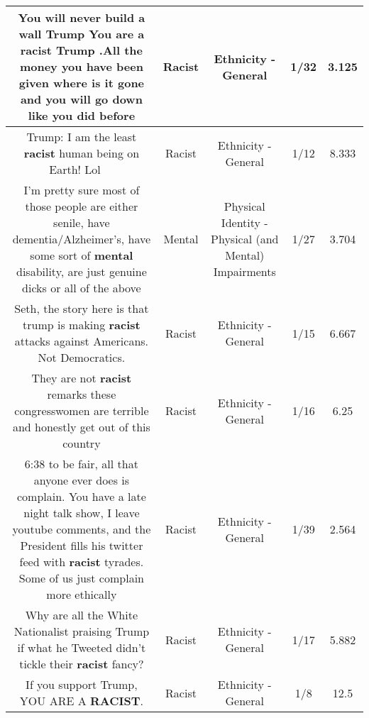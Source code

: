 \documentclass[11pt]{article}
\newlength\mylength
\begin{document}
\begin{center}
\begin{longtable}{|C{.65\mylength}|C{.30\mylength}|C{.12\mylength}|C{.12\mylength}|C{.12\mylength}|}
  \small You will never build a wall Trump You are a \textbf{racist} Trump .All the money you have been given where is it gone and you will go down like you did before\normalsize   & Racist & Ethnicity - General & 1/32 & 3.125 \\  \hline
  \small Trump: I am the least \textbf{racist} human being on Earth! Lol 🤣🤣🤣\normalsize   & Racist & Ethnicity - General & 1/12 & 8.333 \\  \hline
  \small I'm pretty sure most of those people are either senile, have dementia/Alzheimer's, have some sort of \textbf{mental} disability, are just genuine dicks or all of the above\normalsize   & Mental & Physical Identity - Physical (and Mental) Impairments & 1/27 & 3.704 \\  \hline
  \small Seth, the story here is that trump is making \textbf{racist} attacks against Americans. Not Democratics.\normalsize   & Racist & Ethnicity - General & 1/15 & 6.667 \\  \hline
  \small They are not \textbf{racist} remarks these congresswomen are terrible and honestly get out of this country\normalsize   & Racist & Ethnicity - General & 1/16 & 6.25 \\  \hline
  \small \@6:38 to be fair, all that anyone ever does is complain. You have a late night talk show, I leave youtube comments, and the President fills his twitter feed with \textbf{racist} tyrades. Some of us just complain more ethically\normalsize   & Racist & Ethnicity - General & 1/39 & 2.564 \\  \hline
  \small Why are all the White Nationalist praising Trump if what he Tweeted didn't tickle their \textbf{racist} fancy?\normalsize   & Racist & Ethnicity - General & 1/17 & 5.882 \\  \hline
  \small If you support Trump, YOU ARE A \textbf{RACIST}.\normalsize   & Racist & Ethnicity - General & 1/8 & 12.5 \\  \hline

\end{longtable}
\end{center}
\end{document}
